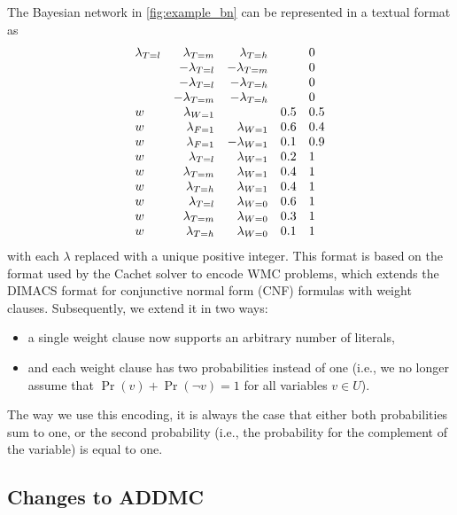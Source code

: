 \documentclass{article}
\theoremstyle{definition}
\theoremstyle{remark}
\begin{document}
{The Bayesian network in \cref{fig:example_bn} can be represented in a textual
format as
\[
  \begin{array}{l r r l l}
    \lambda\sb{T=l} &\lambda\sb{T=m} &\lambda\sb{T=h} & &0 \\
                    &-\lambda\sb{T=l} &-\lambda\sb{T=m} & &0 \\
                    &-\lambda\sb{T=l} &-\lambda\sb{T=h} & &0 \\
                    &-\lambda\sb{T=m} &-\lambda\sb{T=h} & &0 \\
    w &\lambda\sb{W=1} & &0.5 &0.5 \\
    w &\lambda\sb{F=1} &\lambda\sb{W=1} &0.6 &0.4 \\
    w &\lambda\sb{F=1} &-\lambda\sb{W=1} &0.1 &0.9 \\
    w &\lambda\sb{T=l} &\lambda\sb{W=1} &0.2 &1 \\
    w &\lambda\sb{T=m} &\lambda\sb{W=1} &0.4 &1 \\
    w &\lambda\sb{T=h} &\lambda\sb{W=1} &0.4 &1 \\
    w &\lambda\sb{T=l} &\lambda\sb{W=0} &0.6 &1 \\
    w &\lambda\sb{T=m} &\lambda\sb{W=0} &0.3 &1 \\
    w &\lambda\sb{T=h} &\lambda\sb{W=0} &0.1 &1
  \end{array}
\]
with each $\lambda$ replaced with a unique positive integer. This format is
based on the format used by the Cachet solver \cite{DBLP:conf/sat/SangBBKP04}
to encode WMC problems, which extends the DIMACS format for conjunctive normal
form (CNF) formulas with weight clauses. Subsequently, we extend it in two
ways:
\begin{itemize}
\item a single weight clause now supports an arbitrary number of literals,
\item and each weight clause has two probabilities instead of one (i.e., we no
  longer assume that $\Pr(v) + \Pr(\neg v) = 1$ for all variables $v \in U$).
\end{itemize}
The way we use this encoding, it is always the case that either both
probabilities sum to one, or the second probability (i.e., the probability for
the complement of the variable) is equal to one.

\subsection{Changes to ADDMC}

}
\end{document}
